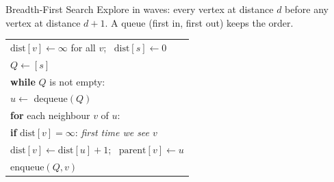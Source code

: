 \documentclass[10pt,aspectratio=169]{beamer}
\begin{document}
\begin{frame}{Breadth-First Search}
  Explore in \alert{waves}: every vertex at distance $d$ before any vertex at
  distance $d + 1$. A \alert{queue} (first in, first out) keeps the order.

  \bigskip
  \begin{center}
  \begin{tabular}{l}
    $\text{dist}[v] \gets \infty$ for all $v$; \ $\text{dist}[s] \gets 0$ \\
    $Q \gets [s]$ \\
    \textbf{while} $Q$ is not empty: \\
    \quad $u \gets$ dequeue$(Q)$ \\
    \quad \textbf{for} each neighbour $v$ of $u$: \\
    \quad\quad \textbf{if} $\text{dist}[v] = \infty$: \hfill \textit{first time we see $v$} \\
    \quad\quad\quad $\text{dist}[v] \gets \text{dist}[u] + 1$;
                    \ $\text{parent}[v] \gets u$ \\
    \quad\quad\quad enqueue$(Q, v)$
  \end{tabular}
  \end{center}
\end{frame}
\end{document}
